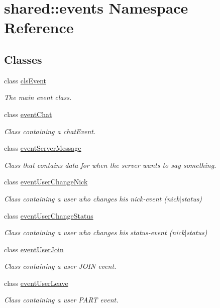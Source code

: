 \hypertarget{namespaceshared_1_1events}{\section{shared\-:\-:events Namespace Reference}
\label{d0/df8/namespaceshared_1_1events}
}
\subsection*{Classes}
\begin{DoxyCompactItemize}
\item 
class \hyperlink{classshared_1_1events_1_1cls_event}{cls\-Event}
\begin{DoxyCompactList}\small\item\em The main event class. \end{DoxyCompactList}\item 
class \hyperlink{classshared_1_1events_1_1event_chat}{event\-Chat}
\begin{DoxyCompactList}\small\item\em Class containing a chat\-Event. \end{DoxyCompactList}\item 
class \hyperlink{classshared_1_1events_1_1event_server_message}{event\-Server\-Message}
\begin{DoxyCompactList}\small\item\em Class that contains data for when the server wants to say something. \end{DoxyCompactList}\item 
class \hyperlink{classshared_1_1events_1_1event_user_change_nick}{event\-User\-Change\-Nick}
\begin{DoxyCompactList}\small\item\em Class containing a user who changes his nick-\/event (nick$|$status) \end{DoxyCompactList}\item 
class \hyperlink{classshared_1_1events_1_1event_user_change_status}{event\-User\-Change\-Status}
\begin{DoxyCompactList}\small\item\em Class containing a user who changes his status-\/event (nick$|$status) \end{DoxyCompactList}\item 
class \hyperlink{classshared_1_1events_1_1event_user_join}{event\-User\-Join}
\begin{DoxyCompactList}\small\item\em Class containing a user J\-O\-I\-N event. \end{DoxyCompactList}\item 
class \hyperlink{classshared_1_1events_1_1event_user_leave}{event\-User\-Leave}
\begin{DoxyCompactList}\small\item\em Class containing a user P\-A\-R\-T event. \end{DoxyCompactList}\end{DoxyCompactItemize}
